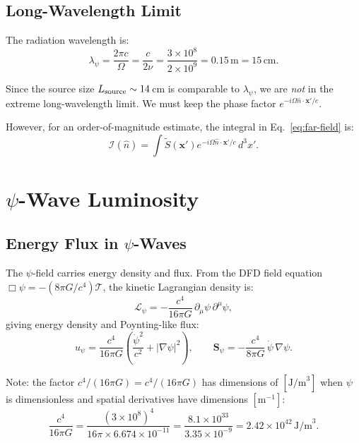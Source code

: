 \documentclass[11pt]{article}
\begin{document}
\subsection{Long-Wavelength Limit}

The radiation wavelength is:
\begin{equation}
\lambda_\psi = \frac{2\pi c}{\Omega} = \frac{c}{2\nu}
  = \frac{3 \times 10^8}{2 \times 10^9} = 0.15\,\text{m} = 15\,\text{cm}.
\end{equation}

Since the source size $L_{\rm source} \sim 14$\,cm is comparable to
$\lambda_\psi$, we are \emph{not} in the extreme long-wavelength limit.
We must keep the phase factor $e^{-i\Omega\hat{n}\cdot\mathbf{x}'/c}$.

However, for an order-of-magnitude estimate, the integral in
Eq.~\eqref{eq:far-field} is:
\begin{equation}
\mathcal{I}(\hat{n}) = \int \tilde{S}(\mathbf{x}')
  e^{-i\Omega\hat{n}\cdot\mathbf{x}'/c}\,d^3x'.
\end{equation}

\section{$\psi$-Wave Luminosity}\label{sec:luminosity}

\subsection{Energy Flux in $\psi$-Waves}

The $\psi$-field carries energy density and flux. From the DFD field equation
$\Box\psi = -(8\pi G/c^4)\mathcal{T}$, the kinetic Lagrangian density is:
\begin{equation}
\mathcal{L}_\psi = -\frac{c^4}{16\pi G}\,\partial_\mu\psi\,\partial^\mu\psi,
\end{equation}
giving energy density and Poynting-like flux:
\begin{equation}
u_\psi = \frac{c^4}{16\pi G}\left(\frac{\dot{\psi}^2}{c^2}
  + |\nabla\psi|^2\right), \qquad
\mathbf{S}_\psi = -\frac{c^4}{8\pi G}\,\dot{\psi}\,\nabla\psi.
\end{equation}

Note: the factor $c^4/(16\pi G) = c^4/(16\pi G)$ has dimensions of
$[\text{J/m}^3]$ when $\psi$ is dimensionless and spatial derivatives
have dimensions $[\text{m}^{-1}]$:
\begin{equation}
\frac{c^4}{16\pi G} = \frac{(3\times10^8)^4}{16\pi \times 6.674\times10^{-11}}
  = \frac{8.1\times10^{33}}{3.35\times10^{-9}} = 2.42 \times 10^{42}\,
  \text{J/m}^3.
\end{equation}
\end{document}

